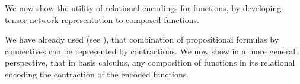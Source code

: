 
We now show the utility of relational encodings for functions, by developing tensor network representation to composed functions.


We have already used (see ), that combination of propositional formulas by connectives can be represented by contractions.
We now show in a more general perspective, that in basis calculus, any composition of functions in its relational encoding the contraction of the encoded functions.

